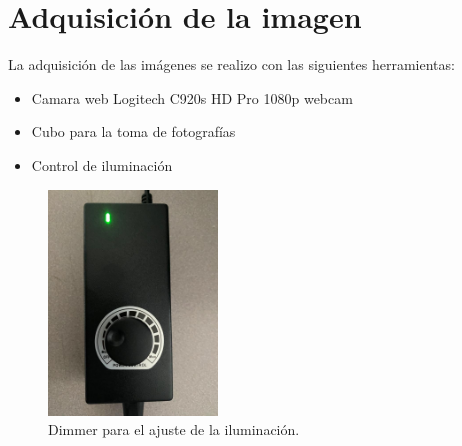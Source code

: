 \documentclass[a4paper, 11pt]{article}
\begin{document}












\section{Adquisición de la imagen}

La adquisición de las imágenes se realizo con las siguientes herramientas:

\begin{itemize}
\item Camara web Logitech C920s HD Pro 1080p webcam 
\item Cubo para la toma de fotografías
\item Control de iluminación
\end{itemize}

\begin{figure}[ht]
\centering
\includegraphics[width=0.4\textwidth]{dimer1}
\caption{Dimmer para el ajuste de la iluminación.}
\label{dimmer}
\end{figure}
\end{document}
